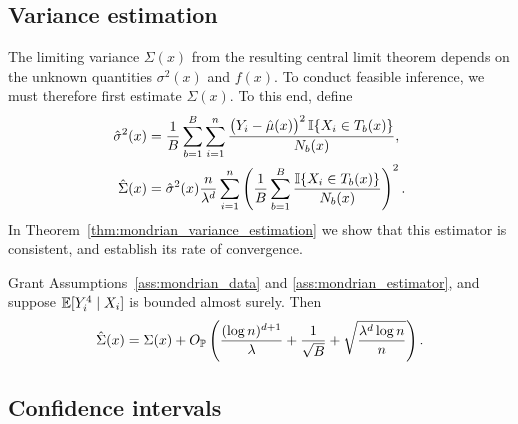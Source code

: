 \subsection*{Variance estimation}

The limiting variance $\Sigma(x)$ from the resulting central limit theorem
depends on the unknown quantities $\sigma^2(x)$ and $f(x)$.
To conduct feasible inference, we must therefore first estimate
$\Sigma(x)$. To this end, define
%
\begin{align}
  \label{eq:mondrian_sigma2_hat}
  \hat\sigma^2(x)
  &=
  \frac{1}{B} \sum_{b=1}^{B} \sum_{i=1}^n
  \frac{\big(Y_i - \hat \mu(x)\big)^2 \, \I\{X_i \in T_b(x)\}} {N_b(x)}, \\
  \nonumber
  \hat\Sigma(x)
  &=
  \hat\sigma^2(x) \frac{n}{\lambda^d} \sum_{i=1}^n
  \left( \frac{1}{B} \sum_{b=1}^B \frac{\I\{X_i \in T_b(x)\}}{N_b(x)} \right)^2.
\end{align}
%
In Theorem~\ref{thm:mondrian_variance_estimation} we show that this
estimator is consistent, and establish its rate of convergence.
%
\begin{theorem}%
  \label{thm:mondrian_variance_estimation}
  Grant Assumptions~\ref{ass:mondrian_data} and \ref{ass:mondrian_estimator},
  and
  suppose $\E[Y_i^4 \mid X_i ]$ is bounded almost surely. Then
  \begin{align*}
    \hat\Sigma(x)
    = \Sigma(x)
    + O_\P \left(
      \frac{(\log n)^{d+1}}{\lambda}
      + \frac{1}{\sqrt B} + \sqrt{\frac{\lambda^d \log n}{n}}
    \right).
  \end{align*}

\end{theorem}

\subsection{Confidence intervals}

